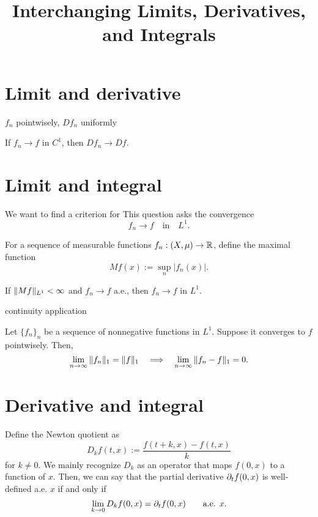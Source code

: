 \documentclass{../exp}
\title{Interchanging Limits, Derivatives, and Integrals}
\begin{document}
\maketitle

\section{Limit and derivative}
\begin{thm}
$f_n$ pointwisely, $Df_n$ uniformly
\end{thm}
\begin{cor}
If $f_n\to f$ in $C^1$, then $Df_n\to Df$.
\end{cor}






\section{Limit and integral}
We want to find a criterion for 
This question asks the convergence
\[f_n\to f\quad\text{in}\quad L^1.\]

For a sequence of measurable functions $f_n:(X,\mu)\to\R$, define the maximal function
\[Mf(x):=\sup_n|f_n(x)|.\]
\begin{thm}[LDCT]
If $\|Mf\|_{L^1}<\infty$ and $f_n\to f$ a.e., then $f_n\to f$ in $L^1$.
\end{thm}

continuity application






\begin{thm}[Scheffe]
Let $\{f_n\}_n$ be a sequence of nonnegative functions in $L^1$.
Suppose it converges to $f$ pointwisely.
Then,
\[\lim_{n\to\oo}\|f_n\|_1=\|f\|_1\impl\lim_{n\to\oo}\|f_n-f\|_1=0.\]
\end{thm}



\section{Derivative and integral}

Define the Newton quotient as
\[D_kf(t,x):=\frac{f(t+k,x)-f(t,x)}k\]
for $k\ne0$.
We mainly recognize $D_k$ as an operator that maps $f(0,x)$ to a function of $x$.
Then, we can say that the partial derivative $\pd_tf(0,x)$ is well-defined a.e. $x$ if and only if
\[\lim_{k\to0}D_kf(0,x)=\pd_tf(0,x)\qquad\text{a.e. }x.\]
\end{document}
